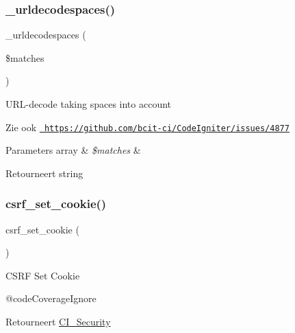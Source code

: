 \subsubsection{\texorpdfstring{\_urldecodespaces()}{\_urldecodespaces()}}
{\footnotesize\ttfamily \+\_\+urldecodespaces (\begin{DoxyParamCaption}\item[{}]{\$matches }\end{DoxyParamCaption})\hspace{0.3cm}{\ttfamily [protected]}}

U\+R\+L-\/decode taking spaces into account

\begin{DoxySeeAlso}{Zie ook}
\href{https://github.com/bcit-ci/CodeIgniter/issues/4877}{\texttt{ https\+://github.\+com/bcit-\/ci/\+Code\+Igniter/issues/4877}} 
\end{DoxySeeAlso}

\begin{DoxyParams}[1]{Parameters}
array & {\em \$matches} & \\
\hline
\end{DoxyParams}
\begin{DoxyReturn}{Retourneert}
string 
\end{DoxyReturn}
\mbox{\label{class_c_i___security_a55b1380b93b71ab3d9873bb967c2b9bb}} 
\subsubsection{\texorpdfstring{csrf\_set\_cookie()}{csrf\_set\_cookie()}}
{\footnotesize\ttfamily csrf\+\_\+set\+\_\+cookie (\begin{DoxyParamCaption}{ }\end{DoxyParamCaption})}

C\+S\+RF Set Cookie

@code\+Coverage\+Ignore \begin{DoxyReturn}{Retourneert}
\mbox{\hyperlink{class_c_i___security}{C\+I\+\_\+\+Security}} 
\end{DoxyReturn}
\mbox{\label{class_c_i___security_a3d09c1dc706abfaad987661805c28a06}} 
